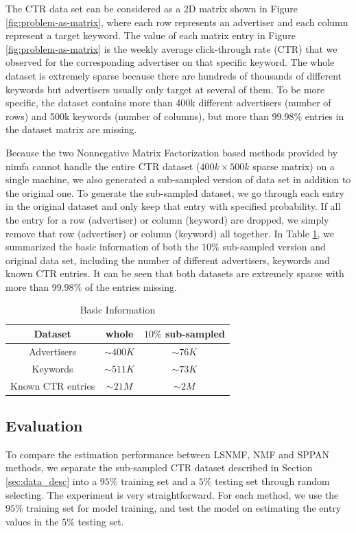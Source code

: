 \documentclass[conference,compsoc]{IEEEtran}
\begin{document}
The CTR data set can be considered as a 2D matrix shown in Figure \ref{fig:problem-as-matrix}, where each row represents an advertiser and each column represent a target keyword. The value of each matrix entry in Figure \ref{fig:problem-as-matrix} is the weekly average click-through rate (CTR) that we observed for the corresponding advertiser on that specific keyword. The whole dataset is extremely sparse because there are hundreds of thousands of different keywords but advertisers usually only target at several of them. To be more specific, the dataset contains more than 400k different advertisers (number of rows) and 500k keywords (number of columns), but more than $99.98\%$ entries in the dataset matrix are missing.

Because the two Nonnegative Matrix Factorization based methods provided by nimfa cannot handle the entire CTR dataset ($400k \times 500k$ sparse matrix) on a single machine, we also generated a sub-sampled version of data set in addition to the original one. To generate the sub-sampled dataset, we go through each entry in the original dataset and only keep that entry with specified probability. If all the entry for a row (advertiser) or column (keyword) are dropped, we simply remove that row (advertiser) or column (keyword) all together. In Table \ref{tab:data}, we summarized the basic information of both the $10\%$ sub-sampled version and original data set, including the number of different advertisers, keywords and known CTR entries. It can be seen that both datasets are extremely sparse with more than $99.98\%$ of the entries missing.


\begin{table}[!ht]
\centering
	\begin{tabular}{|c|c|c|}
	\hline	\hline
	Dataset & whole & $10\%$ sub-sampled\\ \hline
	Advertisers & $\sim 400K$ & $\sim 76K$  \\ 
	Keywords & $\sim 511K$ & $\sim 73K$  \\ 
	Known CTR entries &  $\sim 21M$ & $\sim 2M$ \\ \hline
	\end{tabular}
	\caption{Basic Information}
\label{tab:data}
\end{table}


\subsection{Evaluation}
To compare the estimation performance between LSNMF, NMF and SPPAN methods, we separate the sub-sampled CTR dataset described in Section \ref{sec:data_desc} into a $95\%$ training set and a $5\%$ testing set through random selecting. The experiment is very straightforward. For each method, we use the $95\%$ training set for model training, and test the model on estimating the entry values in the $5\%$ testing set. 
\end{document}
